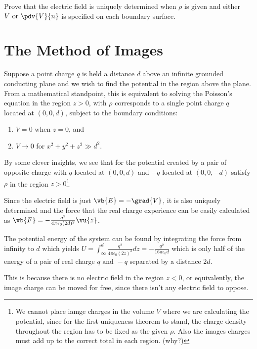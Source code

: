 \documentclass[english,a4paper,12pt]{report}
\begin{document}
{Prove that the electric field is uniquely determined when \(\rho \) is given and either \(V \text { or } \pdv{V}{n} \) is specified on each boundary surface.}
{} 


\section{The Method of Images}

Suppose a point charge \(q\) is held a distance \(d\) above an infinite grounded conducting plane and we wish to find the potential in the region above the plane. From a mathematical standpoint, this is equivalent to solving the Poisson's equation in the region \(z > 0\), with \(\rho \) corresponds to a single point charge  \(q\) located at \((0,0,d )\), subject to the boundary conditions: 
\begin{enumerate}
    \item \(V = 0\) when \(z = 0\), and
    \item \(V \rightarrow 0\) for \(x^2 + y^2 + z^2 \gg d^2\).	
\end{enumerate}

By some clever insights, we see that for the potential created by a pair of opposite charge with \(q\) located at \((0,0,d)\) and \(-q\) located at \((0,0,-d)\) satisfy \(\rho \) in the region \(z > 0\)\footnote{We cannot place iamge charges in the volume \(V\) where we are calculating the potential, since for the first uniqueness theorem to stand, the charge density throughout the region has to be fixed as the given \(\rho \). Also the images charges must add up to the correct total in each region. (why?)} 

Since the electric field is just \(\vb{E} = -\grad{V} \), it is also uniquely determined and the force that the real charge experience can be easily calculated as \( \vb{F} = -\frac{q^2}{4\pi \epsilon _{0} (2d)^2} \vu{z}  \).

The potential energy of the system can be found by integrating the force from infinity to \(d\) which yields \( U = \int_{\infty}^{d}  \frac{q^2}{4\pi \epsilon _{0} (2z)^2} dz = -\frac{q^2}{16\pi \epsilon _{0} d}  \) which is only half of the energy of a pair of real charge \(q \text{ and }  -q\) separated by a distance \(2d\). 

This is because there is no electric field in the region \(z < 0\), or equivalently, the image charge can be moved for free, since there isn't any electric field to oppose. 
\end{document}
